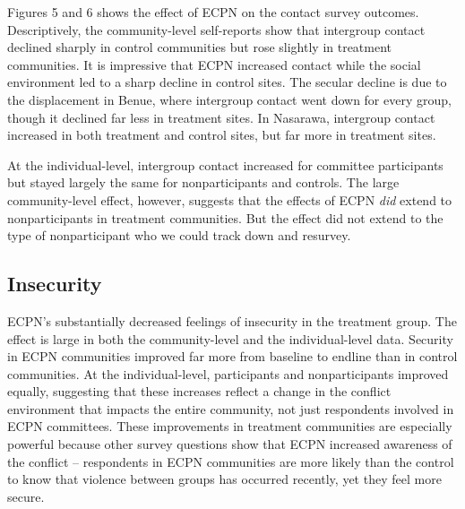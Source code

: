 \documentclass[11pt]{article}
\begin{document}
Figures 5 and 6 shows the effect of ECPN on the contact survey outcomes.
Descriptively, the community-level self-reports show that intergroup
contact declined sharply in control communities but rose slightly in
treatment communities. It is impressive that ECPN increased contact
while the social environment led to a sharp decline in control sites.
The secular decline is due to the displacement in Benue, where
intergroup contact went down for every group, though it declined far
less in treatment sites. In Nasarawa, intergroup contact increased in
both treatment and control sites, but far more in treatment sites.

At the individual-level, intergroup contact increased for committee
participants but stayed largely the same for nonparticipants and
controls. The large community-level effect, however, suggests that the
effects of ECPN \emph{did} extend to nonparticipants in treatment
communities. But the effect did not extend to the type of nonparticipant
who we could track down and resurvey.

\hypertarget{insecurity}{%
\subsection{Insecurity}\label{insecurity}}

ECPN's substantially decreased feelings of insecurity in the treatment
group. The effect is large in both the community-level and the
individual-level data. Security in ECPN communities improved far more
from baseline to endline than in control communities. At the
individual-level, participants and nonparticipants improved equally,
suggesting that these increases reflect a change in the conflict
environment that impacts the entire community, not just respondents
involved in ECPN committees. These improvements in treatment communities
are especially powerful because other survey questions show that ECPN
increased awareness of the conflict -- respondents in ECPN communities
are more likely than the control to know that violence between groups
has occurred recently, yet they feel more secure.
\end{document}
